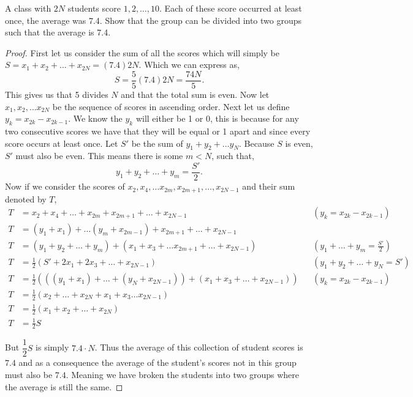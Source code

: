 \documentclass[11pt]{article}
\newenvironment{problem}[2][Problem\!]{\begin{trivlist}
\item[\hskip \labelsep {\bfseries #1}\hskip \labelsep {\bfseries #2}]}{\end{trivlist}}
\begin{document}
\begin{tcolorbox}
    \begin{problem} {OC | 11/24 | PP21}
        A class with $2N$ students score $1,2, \dots, 10$. Each of these score occurred at least once, the average was 7.4. Show that the group can be divided into two groups such that the average is 7.4.
    \end{problem}
\end{tcolorbox}
\begin{proof}
    First let us consider the sum of all the scores which will simply be $S= x_1 + x_2 + \dots + x_{2N} = (7.4)2N$. Which we can express as,
    \[S = \frac{5}{5}(7.4)2N = \frac{74N}{5}.\]
    This gives us that 5 divides $N$ and that the total sum is even. Now let $x_1, x_2, \dots x_{2N}$ be the sequence of scores in ascending order. Next let us define $y_k = x_{2k} - x_{2k -1}$. We know the $y_k$ will either be 1 or 0, this is because for any two consecutive scores we have that they will be equal or 1 apart and since every score occurs at least once. Let $S'$ be the sum of $y_1 + y_2 + \dots y_N$. Because $S$ is even, $S'$ must also be even. This means there is some $m < N$, such that,
    \[y_1 + y_2 + \dots + y_m = \frac{S'}{2}.\]
    Now if we consider the scores of $x_2,x_4, \dots x_{2m}, x_{2m+1} , \dots,  x_{2N -1 } $ and their sum denoted by $T$,
    \begin{align*}
        T &=x_2 + x_4 + \dots + x_{2m} + x_{2m + 1} + \dots + x_{2N - 1} && \left(y_k = x_{2k} - x_{2k -1}\right) \\
        T &=(y_1 + x_1 ) + \dots (y_m + x_{2m - 1}) + x_{2m + 1} + \dots + x_{2N-1} \\
        T &=(y_1 + y_2 + \dots + y_m) + (x_1 + x_3 + \dots x_{2m+1} + \dots + x_{2N-1}) &&  \left(y_1 + \dots + y_m = \frac{S'}{2}\right) \\
        T &=\frac{1}{2}(S' + 2x_1 + 2x_3 + \dots + x_{2N-1}) &&  \left(y_1 + y_2 + \dots + y_N = S'\right) \\
        T &=\frac{1}{2} (((y_1 + x_1) +  \dots + (y_N + x_{2N - 1})) + (x_1 + x_3 + \dots + x_{2N-1})) && \left(y_k = x_{2k} - x_{2k -1}\right)\\
        T &=\frac{1}{2} (x_2 + \dots + x_{2N} + x_1 + x_3 \dots x_{2N-1}) \\
        T &= \frac{1}{2}(x_1 + x_2 + \dots + x_{2N}) \\
        T &=\frac{1}{2} S
    \end{align*}

    But $\dfrac{1}{2}S$ is simply $7.4 \cdot N$. Thus the average of this collection of student scores is $7.4$ and as a consequence the average of the student's scores not in this group must also be $7.4$. Meaning we have broken the students into two groups where the average is still the same. 
\end{proof}
\end{document}
